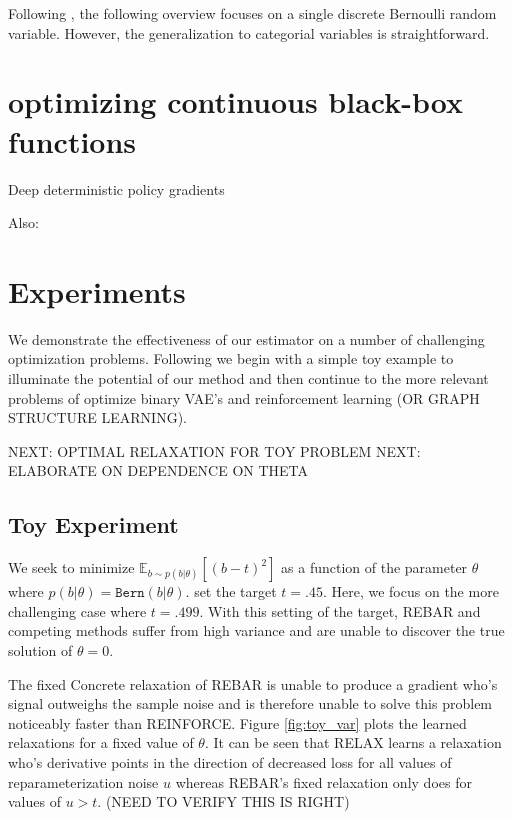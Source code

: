 \documentclass{article}
\newcommand{\relaxed}{r}
\begin{document}
Following \cite{tucker2017rebar}, the following overview focuses on a single discrete Bernoulli random variable.
However, the generalization to categorial variables is straightforward.



\section{optimizing continuous black-box functions}
\label{continuous}
Deep deterministic policy gradients \citep{lillicrap2015continuous}

Also: \citep{levine2016end}


\section{Experiments}
We demonstrate the effectiveness of our estimator on a number of challenging optimization problems. Following \cite{tucker2017rebar} we begin with a simple toy example to illuminate the potential of our method and then continue to the more relevant problems of optimize binary VAE's and reinforcement learning (OR GRAPH STRUCTURE LEARNING).


NEXT: OPTIMAL RELAXATION FOR TOY PROBLEM
NEXT: ELABORATE ON DEPENDENCE ON THETA



\subsection{Toy Experiment}
We seek to minimize $\mathbb{E}_{b \sim p(b|\theta)}[(b - t)^2]$ as a function of the parameter $\theta$ where $p(b|\theta) = \mathtt{Bern}(b|\theta)$. \cite{tucker2017rebar} set the target $t = .45$. Here, we focus on the more challenging case where $t = .499$. With this setting of the target, REBAR and competing methods suffer from high variance and are unable to discover the true solution of $\theta = 0$.

The fixed Concrete relaxation of REBAR is unable to produce a gradient who's signal outweighs the sample noise and is therefore unable to solve this problem noticeably faster than REINFORCE. Figure \ref{fig:toy_var} plots the learned relaxations for a fixed value of $\theta$. It can be seen that RELAX learns a relaxation who's derivative points in the direction of decreased loss for all values of reparameterization noise $u$ whereas REBAR's fixed relaxation  only does for values of $u > t$. (NEED TO VERIFY THIS IS RIGHT)
\end{document}

